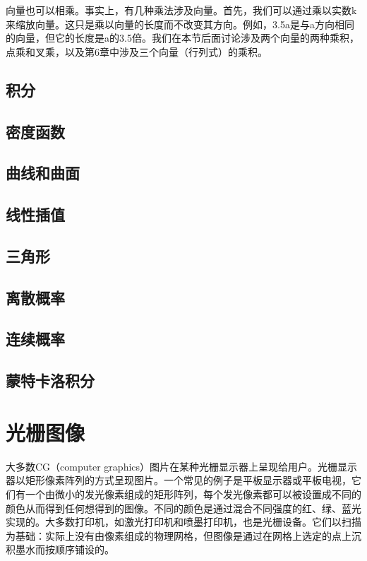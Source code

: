 \documentclass[lang=cn,12pt]{elegantbook}
\begin{document}
向量也可以相乘。事实上，有几种乘法涉及向量。首先，我们可以通过乘以实数k来缩放向量。这只是乘以向量的长度而不改变其方向。例如，3.5a是与a方向相同的向量，但它的长度是a的3.5倍。我们在本节后面讨论涉及两个向量的两种乘积，点乘和叉乘，以及第6章中涉及三个向量（行列式）的乘积。

\section{积分}

\section{密度函数}

\section{曲线和曲面}

\section{线性插值}

\section{三角形}

\section{离散概率}

\section{连续概率}

\section{蒙特卡洛积分}

\chapter{光栅图像}
 
大多数CG（computer graphics）图片在某种光栅显示器上呈现给用户。光栅显示器以矩形像素阵列的方式呈现图片。一个常见的例子是平板显示器或平板电视，它们有一个由微小的发光像素组成的矩形阵列，每个发光像素都可以被设置成不同的颜色从而得到任何想得到的图像。不同的颜色是通过混合不同强度的红、绿、蓝光实现的。大多数打印机，如激光打印机和喷墨打印机，也是光栅设备。它们以扫描为基础：实际上没有由像素组成的物理网格，但图像是通过在网格上选定的点上沉积墨水而按顺序铺设的。
\end{document}
